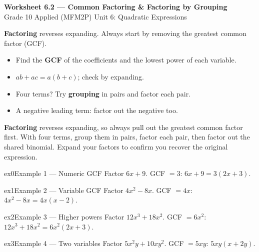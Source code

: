 \documentclass[11pt]{article}
\begin{document}
\begin{center}
{\LARGE\bfseries\color{titleblue}Worksheet 6.2 --- Common Factoring \& Factoring by Grouping}\\[2pt]
{\small Grade 10 Applied (MFM2P) \textperiodcentered{} Unit 6: Quadratic Expressions}
\end{center}

\begin{ideabox}
\textbf{Factoring} reverses expanding. Always start by removing the greatest common factor (GCF).
\begin{itemize}[leftmargin=*,itemsep=2pt]
  \item Find the \textbf{GCF} of the coefficients and the lowest power of each variable.
  \item $ab+ac=a(b+c)$; check by expanding.
  \item Four terms? Try \textbf{grouping} in pairs and factor each pair.
  \item A negative leading term: factor out the negative too.
\end{itemize}
\end{ideabox}

\begin{learnbox}
\textbf{Factoring} reverses expanding, so always pull out the greatest common factor first.
With four terms, group them in pairs, factor each pair, then factor out the shared binomial.
Expand your factors to confirm you recover the original expression.
\end{learnbox}


\begin{example}{ex0}{Example 1 --- Numeric GCF}
Factor $6x+9$.
\soln GCF $=3$: $6x+9=3(2x+3).$
\end{example}

\begin{example}{ex1}{Example 2 --- Variable GCF}
Factor $4x^2-8x$.
\soln GCF $=4x$: $4x^2-8x=4x(x-2).$
\end{example}

\begin{example}{ex2}{Example 3 --- Higher powers}
Factor $12x^3+18x^2$.
\soln GCF $=6x^2$: $12x^3+18x^2=6x^2(2x+3).$
\end{example}

\begin{example}{ex3}{Example 4 --- Two variables}
Factor $5x^2y+10xy^2$.
\soln GCF $=5xy$: $5xy(x+2y).$
\end{example}
\end{document}
